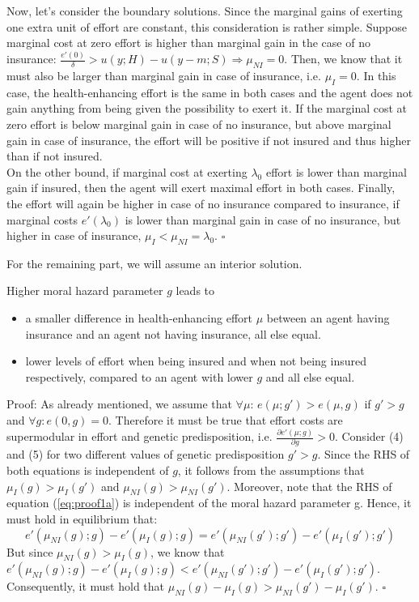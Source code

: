 Now, let's consider the boundary solutions.
Since the marginal gains of exerting one extra unit of effort are constant, this consideration is rather simple.
Suppose marginal cost at zero effort is higher than marginal gain in the case of no insurance:
	$\frac{e'(0)}{\delta}>u(y;H)-u(y-m;S) \Rightarrow \mu_{NI}=0$.
Then, we know that it must also be larger than marginal gain in case of insurance, i.e. $\mu_I=0$.
In this case, the health-enhancing effort is the same in both cases and the agent does not gain anything from being given the possibility to exert it.
If the marginal cost at zero effort is below marginal gain in case of no insurance, but above marginal gain in case of insurance, the effort will be positive if not insured and thus higher than if not insured.\\
On the other bound, if marginal cost at exerting $\lambda_0$ effort is lower than marginal gain if insured, then the agent will exert maximal effort in both cases.
Finally, the effort will again be higher in case of no insurance compared to insurance, if marginal costs $e'(\lambda_0)$ is lower than marginal gain in case of no insurance, but higher in case of insurance, $\mu_I<\mu_{NI}=\lambda_0$. $\square$


For the remaining part, we will assume an interior solution.

\begin{proposition}
	Higher moral hazard parameter $g$ leads to
	\begin{itemize}
		\item a smaller difference in health-enhancing effort $\mu$ between an agent having insurance and an agent not having insurance, all else equal.
		\item lower levels of effort when being insured and when not being insured respectively, compared to an agent with lower $g$ and all else equal.
	\end{itemize}
\end{proposition}
Proof: As already mentioned, we assume that $\forall\mu$:  $e(\mu;g')>e(\mu,g)$ if $g'>g$ and $\forall g: e(0,g)=0$. Therefore it must be true that effort costs are supermodular in effort and genetic predisposition, i.e. $\frac{\partial e'(\mu;g)}{\partial g}>0$. Consider (4) and (5) for two different values of genetic predisposition $g'>g$. Since the RHS of both equations is independent of $g$, it follows from the assumptions that $\mu_I(g)>\mu_I(g')$ and $\mu_{NI}(g)>\mu_{NI}(g')$.
Moreover, note that the RHS of equation (\ref{eq:proof1a}) is independent of the moral hazard parameter g. Hence, it must hold in equilibrium that:
\[e'(\mu_{NI}(g);g)-e'(\mu_I(g);g)=e'(\mu_{NI}(g');g')-e'(\mu_I(g');g')
\]
But since $\mu_{NI}(g)>\mu_I(g)$, we know that $e'(\mu_{NI}(g);g)-e'(\mu_I(g);g)<e'(\mu_{NI}(g');g')-e'(\mu_I(g');g')$. Consequently, it must hold that $\mu_{NI}(g)-\mu_I(g)>\mu_{NI}(g')-\mu_I(g')$. $\square$\\

